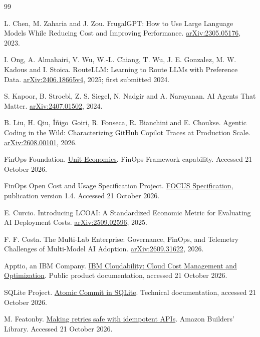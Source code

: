\documentclass[10pt,twocolumn]{article}
\begin{document}
\begin{thebibliography}{99}
\small
\raggedright
\setlength{\itemsep}{3pt}
L. Chen, M. Zaharia and J. Zou. FrugalGPT: How to Use Large Language Models While Reducing Cost and Improving Performance. \href{https://arxiv.org/abs/2305.05176}{arXiv:2305.05176}, 2023.

I. Ong, A. Almahairi, V. Wu, W.-L. Chiang, T. Wu, J. E. Gonzalez, M. W. Kadous and I. Stoica. RouteLLM: Learning to Route LLMs with Preference Data. \href{https://arxiv.org/abs/2406.18665v4}{arXiv:2406.18665v4}, 2025; first submitted 2024.

S. Kapoor, B. Stroebl, Z. S. Siegel, N. Nadgir and A. Narayanan. AI Agents That Matter. \href{https://arxiv.org/abs/2407.01502}{arXiv:2407.01502}, 2024.

B. Liu, H. Qiu, \mbox{\'I\~nigo Goiri}, R. Fonseca, R. Bianchini and E. Choukse. Agentic Coding in the Wild: Characterizing GitHub Copilot Traces at Production Scale. \href{https://arxiv.org/abs/2608.00101}{arXiv:2608.00101}, 2026.

FinOps Foundation. \href{https://www.finops.org/framework/capabilities/unit-economics/}{Unit Economics}. FinOps Framework capability. Accessed 21 October 2026.

FinOps Open Cost and Usage Specification Project. \href{https://focus.finops.org/docs/specification/v1-4/}{FOCUS Specification}, publication version 1.4. Accessed 21 October 2026.

E. Curcio. Introducing LCOAI: A Standardized Economic Metric for Evaluating AI Deployment Costs. \href{https://arxiv.org/abs/2509.02596}{arXiv:2509.02596}, 2025.

F. F. Costa. The Multi-Lab Enterprise: Governance, FinOps, and Telemetry Challenges of Multi-Model AI Adoption. \href{https://arxiv.org/abs/2609.31622}{arXiv:2609.31622}, 2026.

Apptio, an IBM Company. \href{https://www.apptio.com/products/cloudability/}{IBM Cloudability: Cloud Cost Management and Optimization}. Public product documentation, accessed 21 October 2026.

SQLite Project. \href{https://sqlite.org/atomiccommit.html}{Atomic Commit in SQLite}. Technical documentation, accessed 21 October 2026.

M. Featonby. \href{https://aws.amazon.com/builders-library/making-retries-safe-with-idempotent-APIs/}{Making retries safe with idempotent APIs}. Amazon Builders' Library. Accessed 21 October 2026.


\end{thebibliography}
\end{document}
